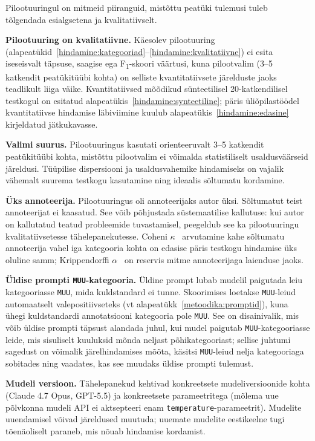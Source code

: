 Pilootuuringul on mitmeid piiranguid, mistõttu peatüki tulemusi tuleb tõlgendada esialgsetena ja kvalitatiivselt.

\textbf{Pilootuuring on kvalitatiivne.} Käesolev pilootuuring (alapeatükid~\ref{hindamine:kategooriad}--\ref{hindamine:kvalitatiivne}) ei esita iseseisvalt täpsuse, saagise ega F\textsubscript{1}-skoori väärtusi, kuna pilootvalim (3--5 katkendit peatükitüübi kohta) on selliste kvantitatiivsete järelduste jaoks teadlikult liiga väike. Kvantitatiivsed mõõdikud sünteetilisel 20-katkendilisel testkogul on esitatud alapeatükis~\ref{hindamine:synteetiline}; päris üliõpilastöödel kvantitatiivse hindamise läbiviimine kuulub alapeatükis~\ref{hindamine:edasine} kirjeldatud jätkukavasse.

\textbf{Valimi suurus.} Pilootuuringus kasutati orienteeruvalt 3--5 katkendit peatükitüübi kohta, mistõttu pilootvalim ei võimalda statistiliselt usaldusväärseid järeldusi. Tüüpilise dispersiooni ja usaldusvahemike hindamiseks on vajalik vähemalt suurema testkogu kasutamine ning ideaalis sõltumatu kordamine.

\textbf{Üks annoteerija.} Pilootuuringus oli annoteerijaks autor üksi. Sõltumatut teist annoteerijat ei kaasatud. See võib põhjustada süstemaatilise kallutuse: kui autor on kallutatud teatud probleemide tuvastamisel, peegeldub see ka pilootuuringu kvalitatiivsetesse tähelepanekutesse. Coheni $\kappa$~\cite{cohen_kappa_1960} arvutamine kahe sõltumatu annoteerija vahel iga kategooria kohta on edasise päris testkogu hindamise üks oluline samm; Krippendorffi $\alpha$~\cite{krippendorff_alpha_2011} on reservis mitme annoteerijaga laienduse jaoks.

\textbf{Üldise prompti \texttt{MUU}-kategooria.} Üldine prompt lubab mudelil paigutada leiu kategooriasse \texttt{MUU}, mida kuldstandard ei tunne. Skoorimises loetakse \texttt{MUU}-leiud automaatselt valepositiivseteks (vt alapeatükk~\ref{metoodika:promptid}), kuna ühegi kuldstandardi annotatsiooni kategooria pole \texttt{MUU}. See on disainivalik, mis võib üldise prompti täpsust alandada juhul, kui mudel paigutab \texttt{MUU}-kategooriasse leide, mis sisuliselt kuuluksid mõnda neljast põhikategooriast; sellise juhtumi sagedust on võimalik järelhindamises mõõta, käsitsi \texttt{MUU}-leiud nelja kategooriaga sobitades ning vaadates, kas see muudaks üldise prompti tulemust.

\textbf{Mudeli versioon.} Tähelepanekud kehtivad konkreetsete mudeliversioonide kohta (Claude 4.7 Opus, GPT-5.5) ja konkreetsete parameetritega (mõlema uue põlvkonna mudeli API ei aktsepteeri enam \texttt{temperature}-parameetrit). Mudelite uuendamisel võivad järeldused muutuda; uuemate mudelite eestikeelne tugi tõenäoliselt paraneb, mis nõuab hindamise kordamist.

